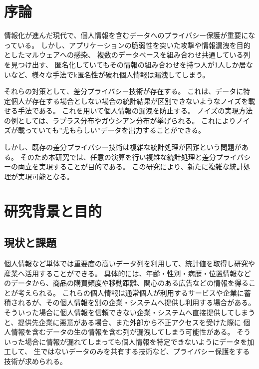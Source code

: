 \documentclass[a4paper,11pt]{jreport}
\begin{document}
\pagebreak \setcounter{page}{1}

\chapter{序論}

情報化が進んだ現代で、個人情報を含むデータへのプライバシー保護が重要になっている。
しかし、アプリケーションの脆弱性を突いた攻撃や情報漏洩を目的としたマルウェアへの感染、
複数のデータベースを組み合わせ共通している列を見つけ出す、
匿名化していてもその情報の組み合わせを持つ人が1人しか居ないなど、様々な手法でk匿名性\cite{k-anon}が破れ個人情報は漏洩してしまう。

それらの対策として、差分プライバシー技術が存在する。
これは、データに特定個人が存在する場合としない場合の統計結果が区別できないようなノイズを載せる手法である。
これを用いて個人情報の漏洩を防止する。
ノイズの実現方法の例としては、ラプラス分布やガウシアン分布が挙げられる。
これによりノイズが載っていても”尤もらしい”データを出力することができる。

しかし、既存の差分プライバシー技術は複雑な統計処理が困難という問題がある。
そのため本研究では、任意の演算を行い複雑な統計処理と差分プライバシーの両立を実現することが目的である。
この研究により、新たに複雑な統計処理が実現可能となる。

\chapter{研究背景と目的}

\section{現状と課題}

個人情報など単体では重要度の高いデータ列を利用して、統計値を取得し研究や産業へ活用することができる。
具体的には、年齢・性別・病歴・位置情報などのデータから、商品の購買頻度や移動距離、関心のある広告などの情報を得ることが考えられる。
これらの個人情報は通常個人が利用するサービスや企業に蓄積されるが、その個人情報を別の企業・システムへ提供し利用する場合がある。
そういった場合に個人情報を信頼できない企業・システムへ直接提供してしまうと、提供先企業に悪意がある場合、また外部から不正アクセスを受けた際に
個人情報を含むデータの生の情報を含む列が漏洩してしまう可能性がある。
そういった場合に情報が漏れてしまっても個人情報を特定できないようにデータを加工して、
生ではないデータのみを共有する技術など、プライバシー保護をする技術が求められる。
\end{document}
